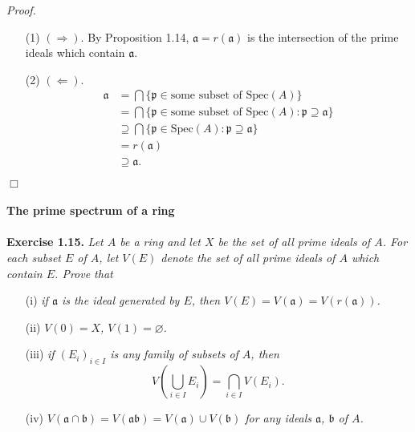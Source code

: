 \documentclass{article}
\begin{document}
\emph{Proof.}
\begin{enumerate}
\item[(1)]
$(\Longrightarrow)$.
By Proposition 1.14,
$\mathfrak{a} = r(\mathfrak{a})$ is the intersection of the prime ideals which contain
$\mathfrak{a}$.
\item[(2)]
$(\Longleftarrow)$.
\begin{align*}
  \mathfrak{a}
  &= \bigcap \{ \mathfrak{p} \in \text{some subset of } \text{Spec}(A) \} \\
  &= \bigcap \{ \mathfrak{p} \in \text{some subset of } \text{Spec}(A)
    : \mathfrak{p} \supseteq \mathfrak{a} \} \\
  &\supseteq
  \bigcap \{ \mathfrak{p} \in \text{Spec}(A) : \mathfrak{p} \supseteq \mathfrak{a} \} \\
  &= r(\mathfrak{a}) \\
  &\supseteq \mathfrak{a}.
\end{align*}
\end{enumerate}
$\Box$ \\\\






\textbf{\large The prime spectrum of a ring} \\\\



\textbf{Exercise 1.15.}
\emph{Let $A$ be a ring and let $X$ be the set of all prime ideals of $A$.
For each subset $E$ of $A$,
let $V(E)$ denote the set of all prime ideals of $A$ which contain $E$.
Prove that}
\begin{enumerate}
\item[(i)]
\emph{if $\mathfrak{a}$ is the ideal generated by $E$,
then $V(E) = V(\mathfrak{a}) = V(r(\mathfrak{a}))$.}
\item[(ii)]
\emph{$V(0) = X$, $V(1) = \varnothing$.}
\item[(iii)]
\emph{if $(E_i)_{i \in I}$ is any family of subsets of $A$,
then
$$V\left( \bigcup_{i \in I}E_i \right) = \bigcap_{i \in I} V(E_i).$$}
\item[(iv)]
\emph{$V(\mathfrak{a} \cap \mathfrak{b})
= V(\mathfrak{a} \mathfrak{b})
= V(\mathfrak{a}) \cup V(\mathfrak{b})$
for any ideals $\mathfrak{a}$, $\mathfrak{b}$ of $A$.}
\end{enumerate}
\end{document}
